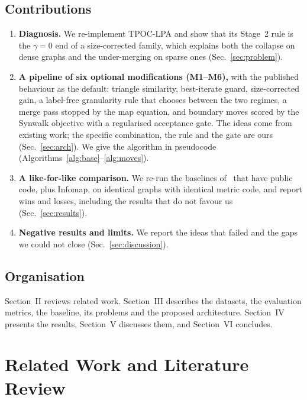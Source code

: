 \documentclass[conference]{IEEEtran}
\begin{document}
\subsection{Contributions}\label{sec:contrib}
\begin{enumerate}
\item \textbf{Diagnosis.} We re-implement TPOC-LPA and show that its Stage~2 rule is the $\gamma{=}0$ end of a size-corrected family, which explains both the collapse on dense graphs and the under-merging on sparse ones (Sec.~\ref{sec:problem}).
\item \textbf{A pipeline of six optional modifications (M1--M6),} with the published behaviour as the default: triangle similarity, best-iterate guard, size-corrected gain, a label-free granularity rule that chooses between the two regimes, a merge pass stopped by the map equation, and boundary moves scored by the Synwalk objective with a regularised acceptance gate. The ideas come from existing work; the specific combination, the rule and the gate are ours (Sec.~\ref{sec:arch}). We give the algorithm in pseudocode (Algorithms~\ref{alg:base}--\ref{alg:moves}).
\item \textbf{A like-for-like comparison.} We re-run the baselines of~\cite{kong2026} that have public code, plus Infomap, on identical graphs with identical metric code, and report wins and losses, including the results that do not favour us (Sec.~\ref{sec:results}).
\item \textbf{Negative results and limits.} We report the ideas that failed and the gaps we could not close (Sec.~\ref{sec:discussion}).
\end{enumerate}

\subsection{Organisation}
Section~II reviews related work. Section~III describes the datasets, the evaluation metrics, the baseline, its problems and the proposed architecture. Section~IV presents the results, Section~V discusses them, and Section~VI concludes.

\section{Related Work and Literature Review}\label{sec:related}
\end{document}
